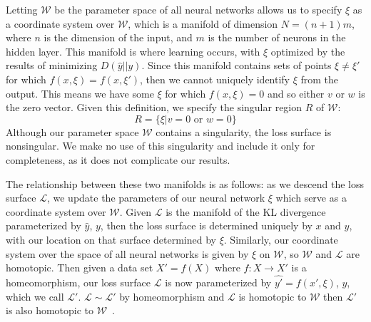 Letting $\mathcal{W}$ be the parameter space of all neural networks allows us to specify $\xi$ as a coordinate system over $\mathcal{W}$, which is a manifold of dimension $N=(n+1)m$, where $n$ is the dimension of the input, and $m$ is the number of neurons in the hidden layer.
This manifold is where learning occurs, with $\xi$ optimized by the results of minimizing $D(\hat{y}||y)$. 
Since this manifold contains sets of points $\xi \neq \xi'$ for which $f(x, \xi) = f(x, \xi')$, then we cannot uniquely identify $\xi$ from the output. 
This means we have some $\xi$ for which $f(x, \xi) = 0$ and so either $v$ or $w$ is the zero vector.
Given this definition, we specify the singular region $R$ of $\mathcal{W}$:
$$R = \{\xi | v = 0 \text{ or } w = 0\}$$
Although our parameter space $\mathcal{W}$ contains a singularity, the loss surface is nonsingular.
We make no use of this singularity and include it only for completeness, as it does not complicate our results.

The relationship between these two manifolds is as follows: as we descend the loss surface $\mathcal{L}$, we update the parameters of our neural network $\xi$ which serve as a coordinate system over $\mathcal{W}$. 
Given $\mathcal{L}$ is the manifold of the KL divergence parameterized by $\hat{y}$, $y$, then the loss surface is determined uniquely by $x$ and $y$, with our location on that surface determined by $\xi$.
Similarly, our coordinate system over the space of all neural networks is given by $\xi$ on $\mathcal{W}$, so $\mathcal{W}$ and $\mathcal{L}$ are homotopic.
Then given a data set $X' = f(X)$ where $f: X \to X'$ is a homeomorphism, our loss surface $\mathcal{L}$ is now parameterized by $\hat{y'} = f(x', \xi)$, $y$, which we call $\mathcal{L'}$.
$\mathcal{L} \sim \mathcal{L'}$ by homeomorphism and $\mathcal{L}$ is homotopic to $\mathcal{W}$ then $\mathcal{L'}$ is also homotopic to $\mathcal{W}$~\cite{hamstrom1974homotopy}.

